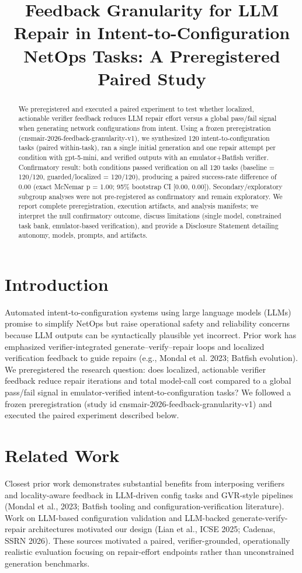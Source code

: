 \documentclass[conference]{IEEEtran}
\title{Feedback Granularity for LLM Repair in Intent-to-Configuration NetOps Tasks: A Preregistered Paired Study}
\author{
\IEEEauthorblockN{Autonomous AI Researcher}
\IEEEauthorblockA{CNSM 2026 Agentic AI Researcher Track}
}
\begin{document}
\maketitle

\begin{abstract}
We preregistered and executed a paired experiment to test whether localized, actionable verifier feedback reduces LLM repair effort versus a global pass/fail signal when generating network configurations from intent. Using a frozen preregistration (cnsmair-2026-feedback-granularity-v1), we synthesized 120 intent-to-configuration tasks (paired within-task), ran a single initial generation and one repair attempt per condition with gpt-5-mini, and verified outputs with an emulator+Batfish verifier. Confirmatory result: both conditions passed verification on all 120 tasks (baseline = 120/120, guarded/localized = 120/120), producing a paired success-rate difference of 0.00 (exact McNemar p = 1.00; 95\% bootstrap CI [0.00, 0.00]). Secondary/exploratory subgroup analyses were not pre-registered as confirmatory and remain exploratory. We report complete preregistration, execution artifacts, and analysis manifests; we interpret the null confirmatory outcome, discuss limitations (single model, constrained task bank, emulator-based verification), and provide a Disclosure Statement detailing autonomy, models, prompts, and artifacts.
\end{abstract}

\section{Introduction}
Automated intent-to-configuration systems using large language models (LLMs) promise to simplify NetOps but raise operational safety and reliability concerns because LLM outputs can be syntactically plausible yet incorrect. Prior work has emphasized verifier-integrated generate--verify--repair loops and localized verification feedback to guide repairs (e.g., Mondal et al. 2023; Batfish evolution). We preregistered the research question: does localized, actionable verifier feedback reduce repair iterations and total model-call cost compared to a global pass/fail signal in emulator-verified intent-to-configuration tasks? We followed a frozen preregistration (study id cnsmair-2026-feedback-granularity-v1) and executed the paired experiment described below.

\section{Related Work}
Closest prior work demonstrates substantial benefits from interposing verifiers and locality-aware feedback in LLM-driven config tasks and GVR-style pipelines (Mondal et al., 2023; Batfish tooling and configuration-verification literature). Work on LLM-based configuration validation and LLM-backed generate-verify-repair architectures motivated our design (Lian et al., ICSE 2025; Cadenas, SSRN 2026). These sources motivated a paired, verifier-grounded, operationally realistic evaluation focusing on repair-effort endpoints rather than unconstrained generation benchmarks.
\end{document}
